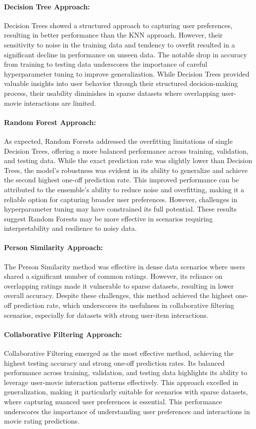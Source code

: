 \documentclass[a4paper,9pt]{article}
\begin{document}
\paragraph{Decision Tree Approach:}
Decision Trees showed a structured approach to capturing user preferences, resulting in better performance than the KNN approach.
However, their sensitivity to noise in the training data and tendency to overfit resulted in a significant decline in performance on unseen data.
The notable drop in accuracy from training to testing data underscores the importance of careful hyperparameter tuning to improve generalization.
While Decision Trees provided valuable insights into user behavior through their structured decision-making process, their usability diminishes in sparse datasets where overlapping user-movie interactions are limited.

\paragraph{Random Forest Approach:}
As expected, Random Forests addressed the overfitting limitations of single Decision Trees, offering a more balanced performance across training, validation, and testing data.
While the exact prediction rate was slightly lower than Decision Trees, the model's robustness was evident in its ability to generalize and achieve the second highest one-off prediction rate.
This improved performance can be attributed to the ensemble's ability to reduce noise and overfitting, making it a reliable option for capturing broader user preferences.
However, challenges in hyperparameter tuning may have constrained its full potential.
These results suggest Random Forests may be more effective in scenarios requiring interpretability and resilience to noisy data.

\paragraph{Person Similarity Approach:}
The Person Similarity method was effective in dense data scenarios where users shared a significant number of common ratings.
However, its reliance on overlapping ratings made it vulnerable to sparse datasets, resulting in lower overall accuracy.
Despite these challenges, this method achieved the highest one-off prediction rate, which underscores its usefulness in collaborative filtering scenarios, especially for datasets with strong user-item interactions.

\paragraph{Collaborative Filtering Approach:}
Collaborative Filtering emerged as the most effective method, achieving the highest testing accuracy and strong one-off prediction rates.
Its balanced performance across training, validation, and testing data highlights its ability to leverage user-movie interaction patterns effectively.
This approach excelled in generalization, making it particularly suitable for scenarios with sparse datasets, where capturing nuanced user preferences is essential.
This performance underscores the importance of understanding user preferences and interactions in movie rating predictions.
\end{document}
